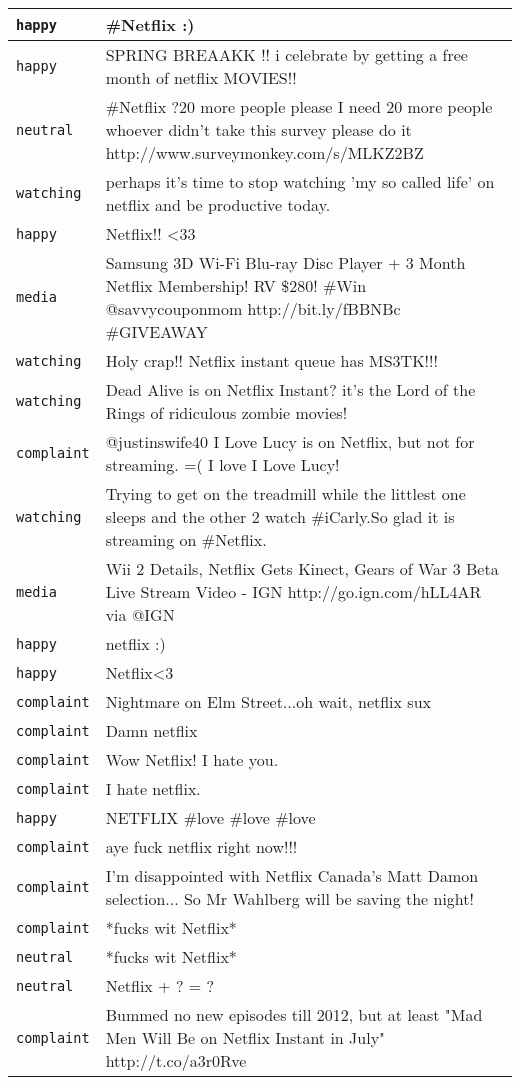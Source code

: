 \begin{center}
\begin{longtable}{|l|p{120mm}|}
      \tabularnewline\hline
         \texttt{happy} & \#Netflix :)
      \tabularnewline\hline
         \texttt{happy} & SPRING BREAAKK !! i celebrate by getting a free month of netflix MOVIES!!
      \tabularnewline\hline
         \texttt{neutral} & \#Netflix ?20 more people please I need 20 more people whoever didn't take this survey please do it http://www.surveymonkey.com/s/MLKZ2BZ
      \tabularnewline\hline
         \texttt{watching} & perhaps it's time to stop watching 'my so called life' on netflix and be productive today.
      \tabularnewline\hline
         \texttt{happy} & Netflix!! <33
      \tabularnewline\hline
         \texttt{media} & Samsung 3D Wi-Fi Blu-ray Disc Player + 3 Month Netflix Membership! RV \$280! \#Win @savvycouponmom http://bit.ly/fBBNBc \#GIVEAWAY
      \tabularnewline\hline
         \texttt{watching} & Holy crap!! Netflix instant queue has MS3TK!!!
      \tabularnewline\hline
         \texttt{watching} & Dead Alive is on Netflix Instant? it's the Lord of the Rings of ridiculous zombie movies!
      \tabularnewline\hline
         \texttt{complaint} & @justinswife40 I Love Lucy is on Netflix, but not for streaming. =( I love I Love Lucy!
      \tabularnewline\hline
         \texttt{watching} & Trying to get on the treadmill while the littlest one sleeps and the other 2 watch \#iCarly.So glad it is streaming on \#Netflix.
      \tabularnewline\hline
         \texttt{media} & Wii 2 Details, Netflix Gets Kinect, Gears of War 3 Beta Live Stream Video - IGN http://go.ign.com/hLL4AR via @IGN
      \tabularnewline\hline
         \texttt{happy} & netflix :)
      \tabularnewline\hline
         \texttt{happy} & Netflix<3
      \tabularnewline\hline
         \texttt{complaint} & Nightmare on Elm Street...oh wait, netflix sux
      \tabularnewline\hline
         \texttt{complaint} & Damn netflix
      \tabularnewline\hline
         \texttt{complaint} & Wow Netflix! I hate you.
      \tabularnewline\hline
         \texttt{complaint} & I hate netflix.
      \tabularnewline\hline
         \texttt{happy} & NETFLIX \#love \#love \#love
      \tabularnewline\hline
         \texttt{complaint} & aye fuck netflix right now!!!
      \tabularnewline\hline
         \texttt{complaint} & I'm disappointed with Netflix Canada's Matt Damon selection... So Mr Wahlberg will be saving the night!
      \tabularnewline\hline
         \texttt{complaint} & *fucks wit Netflix*
      \tabularnewline\hline
         \texttt{neutral} & *fucks wit Netflix*
      \tabularnewline\hline
         \texttt{neutral} & Netflix + ? = ?
      \tabularnewline\hline
         \texttt{complaint} & Bummed no new episodes till 2012, but at least "Mad Men Will Be on Netflix Instant in July" http://t.co/a3r0Rve

\end{longtable}
\end{center}
